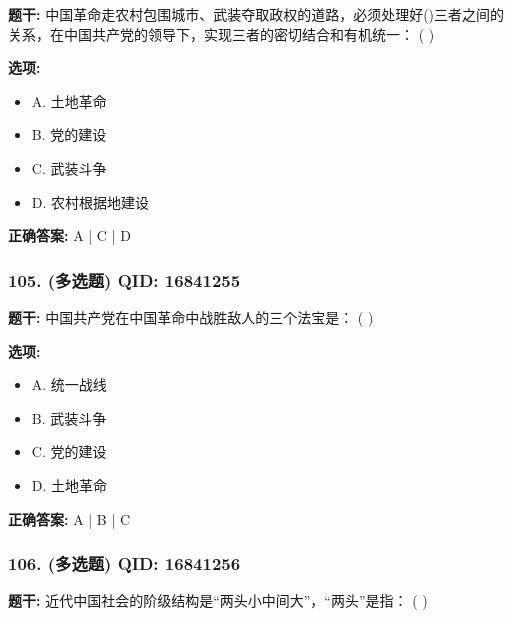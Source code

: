 \documentclass[12pt,UTF8]{ctexart}
\begin{document}
\textbf{题干:}
中国革命走农村包围城市、武装夺取政权的道路，必须处理好()三者之间的关系，在中国共产党的领导下，实现三者的密切结合和有机统一： ( )

\textbf{选项:}
\begin{itemize}[leftmargin=*]

  \item A. 土地革命

  \item B. 党的建设

  \item C. 武装斗争

  \item D. 农村根据地建设

\end{itemize}

\textbf{正确答案:}
A | C | D

\vspace{0.3em}\hrulefill\vspace{0.7em}

\subsubsection*{105. (多选题) \small QID: 16841255}

\textbf{题干:}
中国共产党在中国革命中战胜敌人的三个法宝是： ( )

\textbf{选项:}
\begin{itemize}[leftmargin=*]

  \item A. 统一战线

  \item B. 武装斗争

  \item C. 党的建设

  \item D. 土地革命

\end{itemize}

\textbf{正确答案:}
A | B | C

\vspace{0.3em}\hrulefill\vspace{0.7em}

\subsubsection*{106. (多选题) \small QID: 16841256}

\textbf{题干:}
近代中国社会的阶级结构是“两头小中间大”，“两头”是指： ( )
\end{document}
